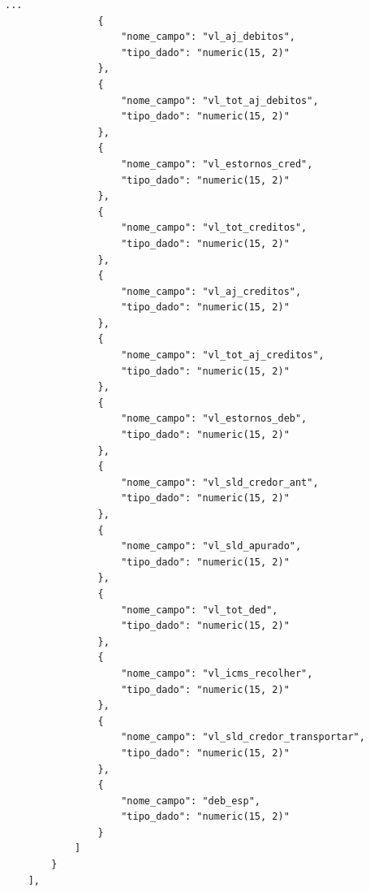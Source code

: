 \begin{quadro}[H]
    \centering
\begin{lstlisting}[basicstyle=\ttfamily\footnotesize, frame=single]
        ...
                {
                    "nome_campo": "vl_aj_debitos",
                    "tipo_dado": "numeric(15, 2)"
                },
                {
                    "nome_campo": "vl_tot_aj_debitos",
                    "tipo_dado": "numeric(15, 2)"
                },
                {
                    "nome_campo": "vl_estornos_cred",
                    "tipo_dado": "numeric(15, 2)"
                },
                {
                    "nome_campo": "vl_tot_creditos",
                    "tipo_dado": "numeric(15, 2)"
                },
                {
                    "nome_campo": "vl_aj_creditos",
                    "tipo_dado": "numeric(15, 2)"
                },
                {
                    "nome_campo": "vl_tot_aj_creditos",
                    "tipo_dado": "numeric(15, 2)"
                },
                {
                    "nome_campo": "vl_estornos_deb",
                    "tipo_dado": "numeric(15, 2)"
                },
                {
                    "nome_campo": "vl_sld_credor_ant",
                    "tipo_dado": "numeric(15, 2)"
                },
                {
                    "nome_campo": "vl_sld_apurado",
                    "tipo_dado": "numeric(15, 2)"
                },
                {
                    "nome_campo": "vl_tot_ded",
                    "tipo_dado": "numeric(15, 2)"
                },
                {
                    "nome_campo": "vl_icms_recolher",
                    "tipo_dado": "numeric(15, 2)"
                },
                {
                    "nome_campo": "vl_sld_credor_transportar",
                    "tipo_dado": "numeric(15, 2)"
                },
                {
                    "nome_campo": "deb_esp",
                    "tipo_dado": "numeric(15, 2)"
                }
            ]
        }
    ],
\end{lstlisting}
\end{quadro}
